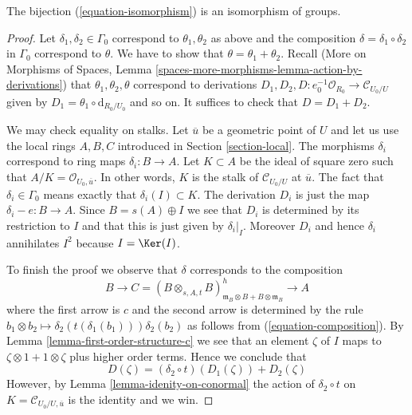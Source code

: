 \begin{lemma}
\label{lemma-composition-is-addition}
The bijection (\ref{equation-isomorphism}) is an isomorphism
of groups.
\end{lemma}

\begin{proof}
Let $\delta_1, \delta_2 \in \Gamma_0$ correspond to $\theta_1, \theta_2$
as above and the composition $\delta = \delta_1 \circ \delta_2$
in $\Gamma_0$ correspond to $\theta$. We have to show that
$\theta = \theta_1 + \theta_2$. Recall
(More on Morphisms of Spaces, Lemma
\ref{spaces-more-morphisms-lemma-action-by-derivations})
that $\theta_1, \theta_2, \theta$ correspond to derivations
$D_1, D_2, D : e_0^{-1}\mathcal{O}_{R_0} \to \mathcal{C}_{U_0/U}$
given by $D_1 = \theta_1 \circ \text{d}_{R_0/U_0}$ and so on.
It suffices to check that $D = D_1 + D_2$.

\medskip\noindent
We may check equality on stalks.
Let $\overline{u}$ be a geometric point of $U$ and let us use the local
rings $A, B, C$ introduced in Section \ref{section-local}.
The morphisms $\delta_i$ correspond to ring
maps $\delta_i : B \to A$. Let $K \subset A$ be the ideal of
square zero such that $A/K = \mathcal{O}_{U_0, \overline{u}}$.
In other words, $K$ is the stalk of $\mathcal{C}_{U_0/U}$ at $\overline{u}$.
The fact that $\delta_i \in \Gamma_0$
means exactly that $\delta_i(I) \subset K$.
The derivation $D_i$ is just the map $\delta_i - e : B \to A$.
Since $B = s(A) \oplus I$ we see that $D_i$ is determined by
its restriction to $I$ and that this is just given by
$\delta_i|_I$. Moreover $D_i$ and hence $\delta_i$ annihilates $I^2$
because $I = \Ker(I)$.

\medskip\noindent
To finish the proof we observe that $\delta$ corresponds to the
composition
$$
B \to C =
(B \otimes_{s, A, t} B)^h_{\mathfrak m_B \otimes B + B \otimes \mathfrak m_B}
\to A
$$
where the first arrow is $c$ and the second arrow is determined
by the rule
$b_1 \otimes b_2 \mapsto \delta_2(t(\delta_1(b_1))) \delta_2(b_2)$
as follows from (\ref{equation-composition}).
By Lemma \ref{lemma-first-order-structure-c}
we see that an element $\zeta$ of $I$ maps to
$\zeta \otimes 1 + 1 \otimes \zeta$ plus higher order terms.
Hence we conclude that
$$
D(\zeta) = (\delta_2 \circ t)\left(D_1(\zeta)\right) + D_2(\zeta)
$$
However, by Lemma \ref{lemma-idenity-on-conormal}
the action of $\delta_2 \circ t$ on
$K = \mathcal{C}_{U_0/U, \overline{u}}$ is the identity and
we win.
\end{proof}






